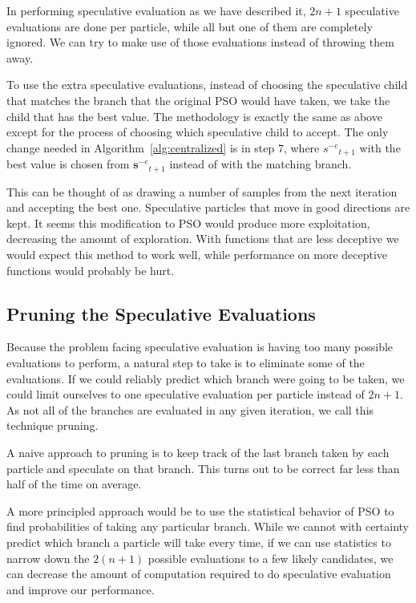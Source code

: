 \documentclass[journal,letterpaper]{IEEEtran}
\newcommand{\alg}[1]{Algorithm~\ref{alg:#1}}
\providecommand{\noeval}[1]{\ensuremath{#1^{-e}}}
\providecommand{\s}{\ensuremath{s}}
\providecommand{\sset}{\ensuremath{\mathbf{s}}}
\begin{document}
In performing speculative evaluation as we have described it, $2n+1$
speculative evaluations are done per particle, while all but one of them are
completely ignored.  We can try to make use of those evaluations instead of
throwing them away.  

To use the extra speculative evaluations, instead of choosing the speculative
child that matches the branch that the original PSO would have taken, we take
the child that has the best value.  The methodology is exactly the same as
above except for the process of choosing which speculative child to accept.
The only change needed in \alg{centralized} is in step 7, where
$\noeval{\s}_{t+1}$ with the best value is chosen from $\noeval{\sset}_{t+1}$
instead of with the matching branch.

This can be thought of as drawing a number of samples from the next iteration
and accepting the best one.  Speculative particles that move in good directions
are kept.  It seems this modification to PSO would produce more exploitation,
decreasing the amount of exploration.  With functions that are less deceptive
we would expect this method to work well, while performance on more deceptive
functions would probably be hurt.

\subsection{Pruning the Speculative Evaluations}
\label{sec:pruning}

Because the problem facing speculative evaluation is having too many possible
evaluations to perform, a natural step to take is to eliminate some of the
evaluations.  If we could reliably predict which branch were going to be taken,
we could limit ourselves to one speculative evaluation per particle instead of
$2n+1$.  As not all of the branches are evaluated in any given iteration, we
call this technique pruning.  

A naive approach to pruning is to keep track of the last branch taken by each
particle and speculate on that branch.  This turns out to be correct far less
than half of the time on average.

A more principled approach would be to use the statistical behavior of PSO to
find probabilities of taking any particular branch.  While we cannot with
certainty predict which branch a particle will take every time, if we can use
statistics to narrow down the $2(n+1)$ possible evaluations to a few likely
candidates, we can decrease the amount of computation required to do
speculative evaluation and improve our performance.
\end{document}
